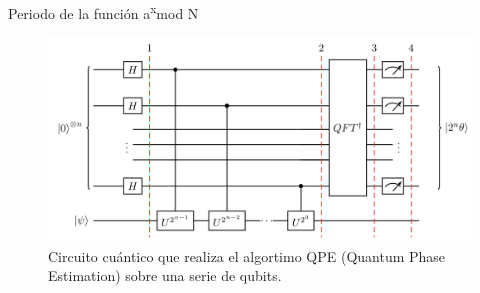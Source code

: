 \begin{frame}{Periodo de la función a\textsuperscript{x}mod N}
\vspace{1cm}
    \begin{figure}[H]
    \includegraphics[scale=0.3]{images/qpe.png}
    \caption{Circuito cuántico que realiza el algortimo QPE (Quantum Phase Estimation) sobre una serie de qubits.}
    \label{fig:qpe}
\end{figure}
\end{frame}